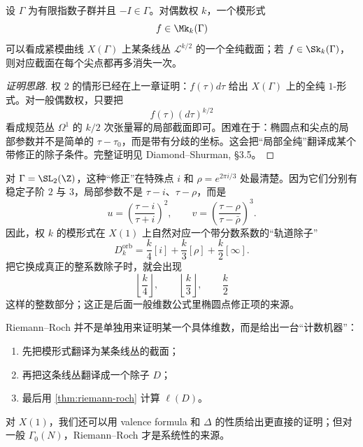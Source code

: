 \begin{proposition}[模形式是线丛截面]
\label{prop:modforms-line-bundle}
设 $\Gamma$ 为有限指数子群并且 $-I\in\Gamma$。对偶数权 $k$，一个模形式
\[
  f\in \Mk_k(\Gamma)
\]
可以看成紧模曲线 $X(\Gamma)$ 上某条线丛 $\mathcal L^{k/2}$ 的一个全纯截面；若 $f\in\Sk_k(\Gamma)$，则对应截面在每个尖点都再多消失一次。
\end{proposition}

\begin{proof}[证明思路]
权 $2$ 的情形已经在上一章证明：$f(\tau)d\tau$ 给出 $X(\Gamma)$ 上的全纯 $1$-形式。对一般偶数权，只要把
\[
  f(\tau)(d\tau)^{k/2}
\]
看成规范丛 $\Omega^1$ 的 $k/2$ 次张量幂的局部截面即可。困难在于：椭圆点和尖点的局部参数并不是简单的 $\tau-\tau_0$，而是带有分歧的坐标。这会把“局部全纯”翻译成某个带修正的除子条件。完整证明见 Diamond--Shurman, §3.5。
\end{proof}

对 $\Gamma=\SL_2(\Z)$，这种“修正”在特殊点 $i$ 和 $\rho=e^{2\pi i/3}$ 处最清楚。因为它们分别有稳定子阶 $2$ 与 $3$，局部参数不是 $\tau-i$、$\tau-\rho$，而是
\[
  u=\left(\frac{\tau-i}{\tau+i}\right)^2,
  \qquad
  v=\left(\frac{\tau-\rho}{\tau-\bar\rho}\right)^3.
\]
因此，权 $k$ 的模形式在 $X(1)$ 上自然对应一个带分数系数的“轨道除子”
\[
  D_k^{\mathrm{orb}}=\frac{k}{4}[i]+\frac{k}{3}[\rho]+\frac{k}{2}[\infty].
\]
把它换成真正的整系数除子时，就会出现
\[
  \left\lfloor\frac{k}{4}\right\rfloor,
  \qquad
  \left\lfloor\frac{k}{3}\right\rfloor,
  \qquad
  \frac{k}{2}
\]
这样的整数部分；这正是后面一般维数公式里椭圆点修正项的来源。

\begin{remark}[本节真正得到的东西]
Riemann--Roch 并不是单独用来证明某一个具体维数，而是给出一台“计数机器”：
\begin{enumerate}
  \item 先把模形式翻译为某条线丛的截面；
  \item 再把这条线丛翻译成一个除子 $D$；
  \item 最后用 \cref{thm:riemann-roch} 计算 $\ell(D)$。
\end{enumerate}
对 $X(1)$，我们还可以用 valence formula 和 $\Delta$ 的性质给出更直接的证明；但对一般 $\Gamma_0(N)$，Riemann--Roch 才是系统性的来源。
\end{remark}
